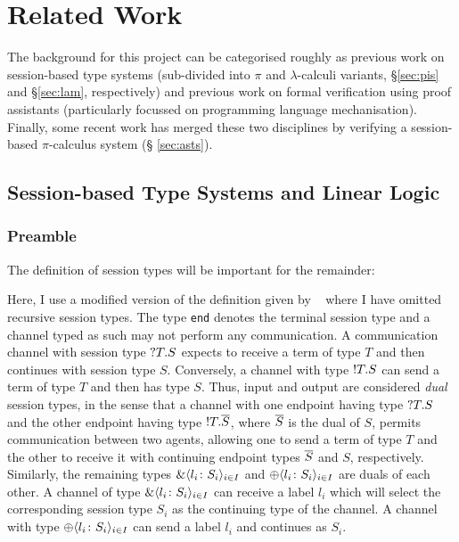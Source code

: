 \section{Related Work}\label{sec:rw}

The background for this project can be categorised roughly as previous work on
session-based type systems (sub-divided into $\pi$ and $\lambda$-calculi
variants, \S \ref{sec:pis} and \S \ref{sec:lam}, respectively) and previous
work on formal verification using proof assistants (particularly focussed on
programming language mechanisation). Finally, some recent work has merged
these two disciplines by verifying a session-based $\pi$-calculus system (\S
\ref{sec:asts}).

\subsection{Session-based Type Systems and Linear Logic}\label{sec:sts}

\subsubsection{Preamble}\label{sec:pre}

The definition of session types will be important for the remainder:


Here, I use a modified version of the definition given by
\citeauthor{Gay:2010:LAST}~\cite{Gay:2010:LAST} where I have omitted recursive
session types. The type \lstinline{end} denotes the terminal session type and
a channel typed as such may not perform any communication. A communication
channel with session type $?{T}.{S}$ expects to receive a term of type $T$
and then continues with session type $S$. Conversely, a channel with type
$!{T}.{S}$ can send a term of type $T$ and then has type $S$. Thus, input
and output are considered \emph{dual} session types, in the sense that a
channel with one endpoint having type $?{T}.{S}$ and the other endpoint
having type $!{T}.{\overline{{S}}}$, where $\overline{{S}}$ is the dual of $S$,
permits communication between two agents, allowing one to send a term of type
$T$ and the other to receive it with continuing endpoint types $\overline{{S}}$ and
$S$, respectively. Similarly, the remaining types $\&\langle{l_i}\colon{S_i}\rangle_{i\in I}$
and $\oplus\langle{l_i}\colon{S_i}\rangle_{i\in I}$ are duals of each other. A channel of type
$\&\langle{l_i}\colon{S_i}\rangle_{i\in I}$ can receive a label $l_i$ which will select the
corresponding session type $S_i$ as the continuing type of the channel. A
channel with type $\oplus\langle{l_i}\colon{S_i}\rangle_{i\in I}$ can send a label $l_i$ and
continues as $S_i$.

